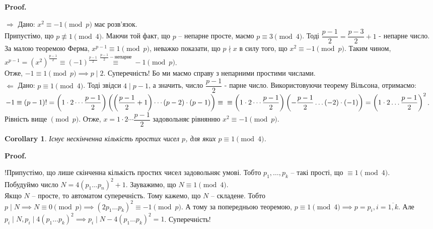\documentclass[a4paper, 14pt]{extarticle}
\makeatletter
\theoremstyle{theoremdd}
\theoremstyle{theoremdd}
\theoremstyle{theoremdd}
\theoremstyle{theoremdd}
\theoremstyle{theoremdd}
\theoremstyle{theoremdd}
\theoremstyle{theoremdd}
\theoremstyle{theoremdd}
\newtheorem{corollary}[theorem]{Corollary}
\def\qed{$\blacksquare$}
\def\rightproof{$\boxed{\Rightarrow}$ }
\def\leftproof{$\boxed{\Leftarrow}$ }
\renewenvironment{proof}[1][Proof.\\]{\par
\pushQED{\hfill \qed}%
\normalfont \topsep6\p@\@plus6\p@\relax
\trivlist
\item\relax
{\bfseries
#1\@addpunct{.}}\hspace\labelsep\ignorespaces
}{%
\popQED\endtrivlist\@endpefalse
}
\makeatother
\begin{document}
\begin{proof}
\rightproof Дано: $x^2 \equiv -1 \pmod p$ має розв'язок.\\
Припустімо, що $p \not\equiv 1 \pmod 4$. Маючи той факт, що $p$ -- непарне просте, маємо $p \equiv 3 \pmod 4$. Тоді $\dfrac{p-1}{2} = \dfrac{p-3}{2} + 1$ - непарне число.\\
За малою теоремою Ферма, $x^{p-1} \equiv 1 \pmod p$, неважко показати, що $p \nmid x$ в силу того, що $x^2 \equiv -1 \pmod p$. Таким чином,\\
$x^{p-1} = \left( x^2 \right)^{\frac{p-1}{2}} \equiv (-1)^{\frac{p-1}{2}} \overset{\frac{p-1}{2} - \text{непарне}}{\equiv} -1 \pmod p$.\\
Отже, $-1 \equiv 1 \pmod p \implies p \mid 2$. Суперечність! Бо ми маємо справу з непарними простими числами.
\bigskip \\
\leftproof Дано: $p \equiv 1 \pmod 4$. Тоді звідси $4 \mid p-1$, а значить, число $\dfrac{p-1}{2}$ - парне число. Використовуючи теорему Вільсона, отримаємо:\\
$-1 \equiv (p-1)! = \left( 1 \cdot 2 \cdots \dfrac{p-1}{2} \right) \left( \left(\dfrac{p-1}{2}+1 \right) \cdots (p-2) \cdot (p-1) \right) \equiv \\
\equiv \left(1 \cdot 2 \cdots \dfrac{p-1}{2} \right) \left( -\dfrac{p-1}{2} \dots (-2) \cdot (-1) \right) = \left(1 \cdot 2 \dots \dfrac{p-1}{2} \right)^2$.\\
Рівність вище $\pmod p$. Отже, $x = 1 \cdot 2 \cdots \dfrac{p-1}{2}$ задовольняє рівнянню $x^2 \equiv -1 \pmod p$.
\end{proof}

\begin{corollary}
Існує нескінченна кількість простих чисел $p$, для яких $p \equiv 1 \pmod 4$.
\end{corollary}

\begin{proof}
!Припустімо, що лише скінченна кількість простих чисел задовольняє умові. Тобто $p_1,\dots,p_k$ -- такі прості, що $\equiv 1 \pmod 4$.\\
Побудуймо число $N = 4(p_1 \dots p_n)^2 + 1$. Зауважимо, що $N \equiv 1 \pmod 4$.\\
Якщо $N$ -- просте, то автоматом суперечність. Тому кажемо, що $N$ -- складене. Тобто $p \mid N \implies N \equiv 0 \pmod p \implies (2p_1 \dots p_k)^2 \equiv -1 \pmod p$. А тому за попередньою теоремою, $p \equiv 1 \pmod 4 \implies p = p_i, i = \overline{1,k}$. Але $p_i \mid N, p_i \mid 4(p_1 \dots p_k)^2 \implies p_i \mid N - 4(p_1 \dots p_k)^2 = 1$. Суперечність!
\end{proof}
\end{document}
